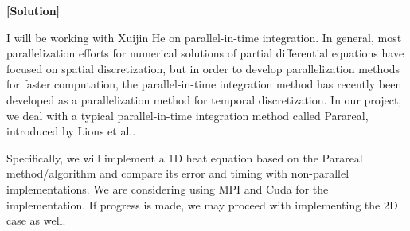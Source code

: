 \documentclass[11pt]{article}
\begin{document}
\begin{enumerate}
  \textbf{[Solution]}

    I will be working with Xuijin He on parallel-in-time integration. In general, most parallelization efforts for numerical solutions of partial differential equations have focused on spatial discretization, but in order to develop parallelization methods for faster computation, the parallel-in-time integration method has recently been developed as a parallelization method for temporal discretization. In our project, we deal with a typical parallel-in-time integration method called Parareal, introduced by Lions et al.\cite{LionsEtAl2001}.

Specifically, we will implement a 1D heat equation based on the Parareal method/algorithm and compare its error and timing with non-parallel implementations. We are considering using MPI and Cuda for the implementation. If progress is made, we may proceed with implementing the 2D case as well.

\end{enumerate}


 

\end{document}
